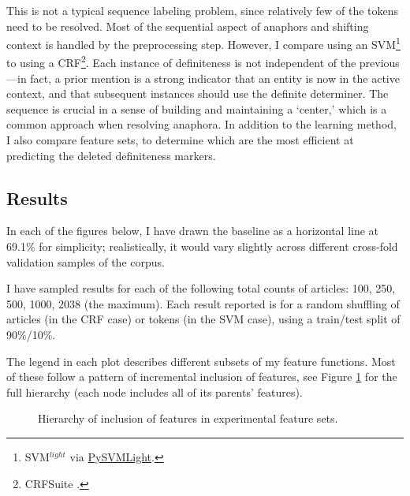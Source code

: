 \documentclass[11pt]{article}\usepackage{graphicx, color}
\begin{document}
This is not a typical sequence labeling problem, since relatively few of the tokens need to be resolved. Most of the sequential aspect of anaphors and shifting context is handled by the preprocessing step. However, I compare using an SVM\footnote{SVM$^{light}$ \citep{joachims:1999} via \href{https://bitbucket.org/wcauchois/pysvmlight}{PySVMLight}.} to using a CRF\footnote{CRFSuite \citep{CRFsuite}.}.
Each instance of definiteness is not independent of the previous---in fact, a prior mention is a strong indicator that an entity is now in the active context, and that subsequent instances should use the definite determiner. The sequence is crucial in a sense of building and maintaining a `center,' which is a common approach when resolving anaphora.
In addition to the learning method, I also compare feature sets, to determine which are the most efficient at predicting the deleted definiteness markers.

\subsection{Results}

In each of the figures below, I have drawn the baseline as a horizontal line at 69.1\% for simplicity; realistically, it would vary slightly across different cross-fold validation samples of the corpus.

I have sampled results for each of the following total counts of articles: 100, 250, 500, 1000, 2038 (the maximum). Each result reported is for a random shuffling of articles (in the CRF case) or tokens (in the SVM case), using a train/test split of 90\%/10\%.

The legend in each plot describes different subsets of my feature functions. Most of these follow a pattern of incremental inclusion of features, see Figure \ref{fig:features} for the full hierarchy (each node includes all of its parents' features).

\begin{figure}
  \centering
  \caption{Hierarchy of inclusion of features in experimental feature sets.}\label{fig:features}
\end{figure}
\end{document}
